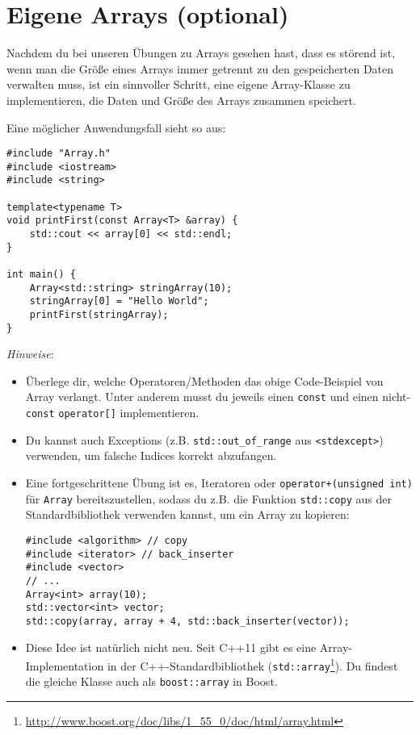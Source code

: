 \section{Eigene Arrays (optional)}
\label{sec:array}

Nachdem du bei unseren Übungen zu Arrays gesehen hast, dass es störend ist, wenn man die Größe eines Arrays immer getrennt zu den gespeicherten Daten verwalten muss, ist ein sinnvoller Schritt, eine eigene Array-Klasse zu implementieren, die Daten und Größe des Arrays zusammen speichert.

Eine möglicher Anwendungsfall sieht so aus:

\begin{lstlisting}
#include "Array.h"
#include <iostream>
#include <string>

template<typename T>
void printFirst(const Array<T> &array) {
    std::cout << array[0] << std::endl;
}

int main() {
    Array<std::string> stringArray(10);
    stringArray[0] = "Hello World";
    printFirst(stringArray);
}
\end{lstlisting}

\emph{Hinweise}:
\begin{itemize}
\item
Überlege dir, welche Operatoren/Methoden das obige Code-Beispiel von Array verlangt.
Unter anderem musst du jeweils einen \lstinline{const} und einen nicht-\lstinline{const} \lstinline{operator[]} implementieren.

\item
Du kannst auch Exceptions (z.B. \lstinline{std::out_of_range} aus \lstinline{<stdexcept>}) verwenden, um falsche Indices korrekt abzufangen.

\item
Eine fortgeschrittene Übung ist es, Iteratoren oder \lstinline{operator+(unsigned int)} für \lstinline|Array| bereitszustellen, sodass du z.B. die Funktion \lstinline{std::copy} aus der Standardbibliothek verwenden kannst, um ein Array zu kopieren:
\begin{lstlisting}
#include <algorithm> // copy
#include <iterator> // back_inserter
#include <vector>
// ...
Array<int> array(10);
std::vector<int> vector;
std::copy(array, array + 4, std::back_inserter(vector));
\end{lstlisting}

\item
Diese Idee ist natürlich nicht neu.
Seit C++11 gibt es eine Array-Implementation in der C++-Standardbibliothek (\lstinline{std::array}\footnote{\url{http://www.boost.org/doc/libs/1_55_0/doc/html/array.html}}).
Du findest die gleiche Klasse auch als \lstinline{boost::array} in Boost.
\end{itemize}

